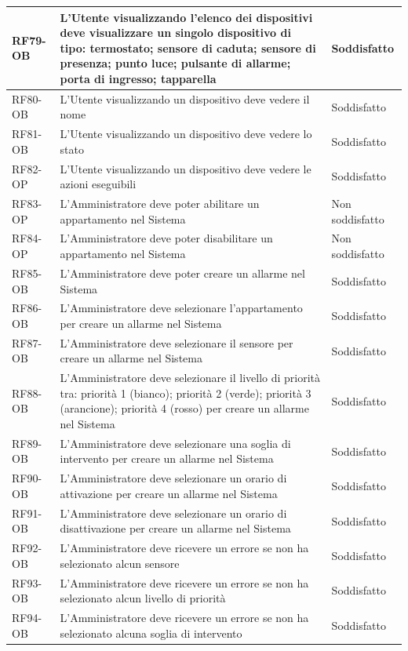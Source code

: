 \begin{longtable}{|p{2.5cm}|p{9cm}|p{3cm}|}
\hline
RF79-OB & L'Utente visualizzando l'elenco dei dispositivi deve visualizzare un singolo dispositivo di tipo: termostato; sensore di caduta; sensore di presenza; punto luce; pulsante di allarme; porta di ingresso; tapparella & Soddisfatto \\
\hline
RF80-OB & L'Utente visualizzando un dispositivo deve vedere il nome & Soddisfatto \\
\hline
RF81-OB & L'Utente visualizzando un dispositivo deve vedere lo stato & Soddisfatto \\
\hline
RF82-OP & L'Utente visualizzando un dispositivo deve vedere le azioni eseguibili & Soddisfatto \\
\hline
RF83-OP & L'Amministratore deve poter abilitare un appartamento nel Sistema & Non soddisfatto \\
\hline
RF84-OP & L'Amministratore deve poter disabilitare un appartamento nel Sistema & Non soddisfatto \\
\hline
RF85-OB & L'Amministratore deve poter creare un allarme nel Sistema & Soddisfatto \\
\hline
RF86-OB & L'Amministratore deve selezionare l'appartamento per creare un allarme nel Sistema & Soddisfatto \\
\hline
RF87-OB & L'Amministratore deve selezionare il sensore per creare un allarme nel Sistema & Soddisfatto \\
\hline
RF88-OB & L'Amministratore deve selezionare il livello di priorità tra: priorità 1 (bianco); priorità 2 (verde); priorità 3 (arancione); priorità 4 (rosso) per creare un allarme nel Sistema & Soddisfatto \\
\hline
RF89-OB & L'Amministratore deve selezionare una soglia di intervento per creare un allarme nel Sistema & Soddisfatto \\
\hline
RF90-OB & L'Amministratore deve selezionare un orario di attivazione per creare un allarme nel Sistema & Soddisfatto \\
\hline
RF91-OB & L'Amministratore deve selezionare un orario di disattivazione per creare un allarme nel Sistema & Soddisfatto \\
\hline
RF92-OB & L'Amministratore deve ricevere un errore se non ha selezionato alcun sensore & Soddisfatto \\
\hline
RF93-OB & L'Amministratore deve ricevere un errore se non ha selezionato alcun livello di priorità & Soddisfatto \\
\hline
RF94-OB & L'Amministratore deve ricevere un errore se non ha selezionato alcuna soglia di intervento & Soddisfatto \\

\end{longtable}

